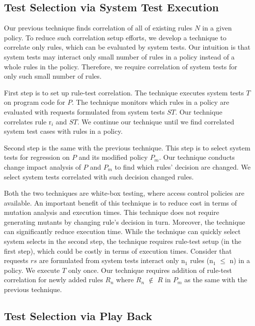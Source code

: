 \subsection{Test Selection via System Test Execution}

Our previous technique finds correlation of all of existing rules $N$ in a given policy. To reduce
such correlation setup efforts, we develop a technique to correlate only rules, which can be evaluated
by system tests. Our intuition is that system tests may interact only small number of rules in a policy
instead of a whole rules in the policy. Therefore, we require correlation of system tests for only such small number of rules.

First step is to set up rule-test correlation.
The technique executes system tests $T$ on program code for $P$. The technique monitors which rules in a policy are evaluated with
requests formulated from system tests $ST$. Our technique correlates rule r$_i$ and $ST$.
We continue our technique until we find correlated system test cases with rules in a policy.

Second step is the same with the previous technique. This step is to select system tests for regression on $P$ and its modified policy $P_m$.
Our technique conducts change impact analysis of $P$ and $P_m$ to find which rules' decision are changed.
We select system tests correlated with such decision changed rules.

Both the two techniques are white-box testing, where access control policies are available.
An important benefit of this technique is to reduce cost in terms of mutation analysis and execution times. This technique does not require generating mutants by changing rule's decision in turn. Moreover, the technique can significantly reduce execution time.
While the technique can quickly select system selects in the second step, the technique requires rule-test setup (in the first step), which could be costly in terms of execution times. Consider that requests $rs$ are formulated from system tests interact only n$_1$ rules (n$_1$ $\leq$ n) in a policy.
We execute $T$ only once. Our technique requires addition of rule-test
correlation for newly added rules $R_n$ where $R_n$ $\notin$ $R$ in $P_m$ as the same with the previous technique.


\subsection{Test Selection via Play Back}

